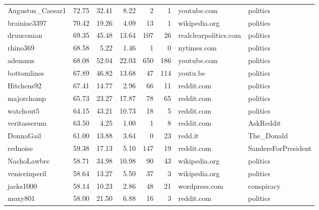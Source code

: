 \begin{tabular}{lrrrrrll}
Augustus\_Caesar1 &       72.75 &     32.41 &       8.22 &           2 &           1 &            youtube.com &             politics \\
brainiac3397     &       70.42 &     19.26 &       4.09 &          13 &           1 &          wikipedia.org &             politics \\
druuconian       &       69.35 &     45.48 &      13.64 &         107 &          26 &  realclearpolitics.com &             politics \\
rhino369         &       68.58 &      5.22 &       1.46 &           1 &           0 &            nytimes.com &             politics \\
ademnus          &       68.08 &     52.04 &      22.03 &         650 &         186 &            youtube.com &             politics \\
bottomlines      &       67.89 &     46.82 &      13.68 &          47 &         114 &               youtu.be &             politics \\
Hitchens92       &       67.41 &     14.77 &       2.96 &          66 &          11 &             reddit.com &             politics \\
majorchamp       &       65.73 &     23.27 &      17.87 &          78 &          65 &             reddit.com &             politics \\
watchout5        &       64.15 &     43.21 &      10.73 &          18 &           5 &             reddit.com &             politics \\
veritasserum     &       63.50 &      4.25 &       1.00 &           1 &           8 &             reddit.com &            AskReddit \\
DonnaGail        &       61.00 &     13.88 &       3.64 &           0 &          23 &                redd.it &           The\_Donald \\
rednoise         &       59.38 &     17.13 &       5.10 &         147 &          19 &             reddit.com &  SandersForPresident \\
NachoLawbre      &       58.71 &     34.98 &      10.98 &          90 &          43 &          wikipedia.org &             politics \\
veniceinperil    &       58.64 &     13.27 &       5.50 &          37 &           3 &          wikipedia.org &             politics \\
jacks1000        &       58.14 &     10.23 &       2.86 &          48 &          21 &          wordpress.com &           conspiracy \\
moxy801          &       58.00 &     21.50 &       6.88 &          16 &           3 &             reddit.com &             politics \\
\bottomrule
\end{tabular}
